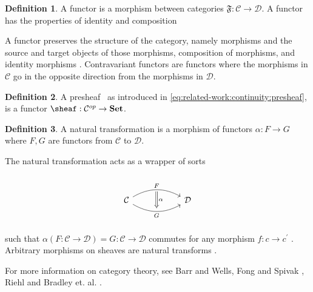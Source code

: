 \documentclass[10pt,journal,compsoc]{IEEEtran}
\theoremstyle{definition}
\newtheorem{definition}{Definition}[section]
\theoremstyle{remark}
\begin{document}
 \begin{definition} A functor is a morphism between categories $\mathfrak{F}: \mathcal{C} \rightarrow \mathcal{D}$. A functor has the properties of identity and composition \cite{riehlCategoryTheoryContext}\end{definition}
A functor preserves the structure of the category, namely morphisms and the source and target objects of those morphisms, composition of morphisms, and identity morphisms \cite{riehlCategoryTheoryContext}. Contravariant functors are functors where the morphisms in $\mathcal{C}$ go in the opposite direction from the morphisms in $\mathcal{D}$.  

 \begin{definition} A presheaf \sheafc\, as introduced in \autoref{eq:related-work:continuity:presheaf}, is a functor $\sheaf: \mathcal{C}^{op} \rightarrow \textbf{Set}$.\cite{nlab:presheaf} \end{definition}

 \begin{definition} A natural transformation is a morphism of functors $\alpha: F \rightarrow G$ where $F, G$ are functors from $\mathcal{C}$ to $\mathcal{D}$. \cite{riehlCategoryTheoryContext, bradleyWhatNaturalTransformation}
 \end{definition}
The natural transformation acts as a wrapper of sorts
\begin{equation}
  \label{eq:related-work:equivariance:natural-transform}
\begin{tikzcd}
  & {} \arrow[dd, "\alpha", Rightarrow, shorten=1.5em] &             \\
\mathcal{C} \arrow[rr, "F", bend left] \arrow[rr, "G"', bend right] &                                     & \mathcal{D} \\
  & {}                                  &            
\end{tikzcd}
\end{equation}
such that $\alpha(F: \mathcal{C} \rightarrow \mathcal{D}) = G: \mathcal{C} \rightarrow \mathcal{D}$ commutes for any morphism $f:c\rightarrow c^{\prime}$ \cite{fongInvitationAppliedCategory2019}. Arbitrary morphisms on sheaves are natural transforms \cite{SheafMathematics2021,bradleyWhatNaturalTransformation}. 

For more information on category theory, see Barr and Wells\cite{barrCategoryTheoryComputing}, Fong and Spivak \cite{fongInvitationAppliedCategory2019}, Riehl\cite{riehlCategoryTheoryContext} and Bradley et. al. \cite{bradleyTopologyCategoricalApproach2020}.
\end{document}
